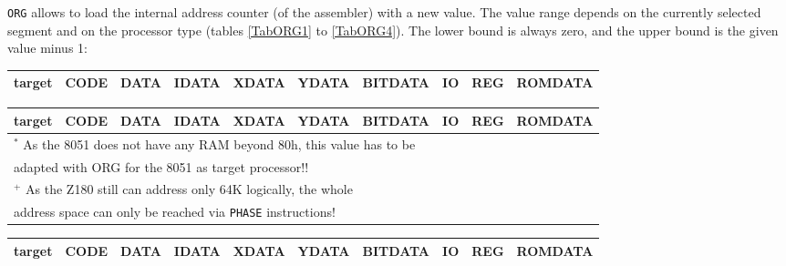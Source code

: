 \documentclass[12pt,twoside]{report}
\newcommand{\tty}[1]{{\tt #1}}
\newcommand{\tin}[1]{{\scriptsize #1}}
\begin{document}
\tty{ORG} allows to load the internal address counter (of the assembler)
with a new value. The value range depends on the currently selected
segment and on the processor type (tables \ref{TabORG1} to \ref{TabORG4}).
The lower bound is always zero, and the upper bound is the given value
minus 1:
\small
\begin{table*}[htbp]
\begin{center}\begin{tabular}{|l|c|c|c|c|c|c|c|c|c|}
\hline
\tin{target} & \tin{CODE} & \tin{DATA} & \tin{IDATA} & \tin{XDATA} & \tin{YDATA} & \tin{BITDATA} & \tin{IO} & \tin{REG} & \tin{ROMDATA} \\
\hline
\hline

\hline
\end{tabular}\end{center}
\caption{Address Ranges for \tty{ORG} --- Part 1\label{TabORG1}}
\end{table*}
\begin{table*}[htbp]
\begin{center}\begin{tabular}{|l|c|c|c|c|c|c|c|c|c|}
\hline
\tin{target} & \tin{CODE} & \tin{DATA} & \tin{IDATA} & \tin{XDATA} & \tin{YDATA} & \tin{BITDATA} & \tin{IO} & \tin{REG} & \tin{ROMDATA} \\
\hline
\hline

\hline
\multicolumn{10}{|l|}{$^{*}$ As the 8051 does not have any RAM beyond 80h, this value has to be} \\
\multicolumn{10}{|l|}{   adapted with ORG for the 8051 as target processor!!}\\
\hline
\multicolumn{10}{|l|}{$^{+}$ As the Z180 still can address only 64K logically, the whole}\\
\multicolumn{10}{|l|}{   address space can only be reached via \tty{PHASE} instructions!}\\
\hline
\end{tabular}\end{center}
\caption{Address Ranges for \tty{ORG} --- Part 2\label{TabORG2}}
\end{table*}
\begin{table*}[htbp]
\begin{center}\begin{tabular}{|l|c|c|c|c|c|c|c|c|c|}
\hline
\tin{target} & \tin{CODE} & \tin{DATA} & \tin{IDATA} & \tin{XDATA} & \tin{YDATA} & \tin{BITDATA} & \tin{IO} & \tin{REG} & \tin{ROMDATA} \\
\hline
\hline

\hline
\end{tabular}\end{center}
\caption{Address Ranges for \tty{ORG} --- Part 3\label{TabORG3}}
\end{table*}
\end{document}
